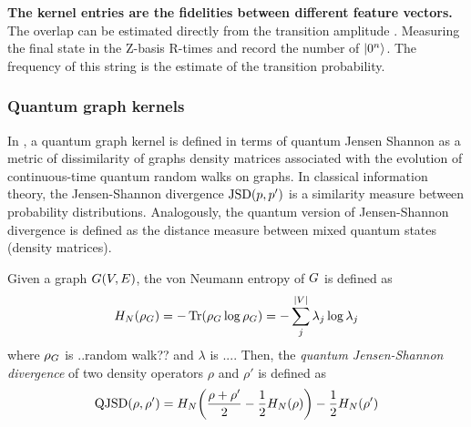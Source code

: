 \textbf{The kernel entries are the fidelities between different feature vectors.}
The overlap can be estimated directly from the transition amplitude 
.
Measuring the final state in the Z-basis R-times and record the number of $\ket{0^n}$.
The frequency of this string is the estimate of the transition probability.


\subsubsection{Quantum graph kernels}
In \cite{baiQuantumJensenShannon2015},
a quantum graph kernel is defined in terms of quantum Jensen Shannon as a metric of dissimilarity of graphs
density matrices associated with the evolution of continuous-time quantum random walks on graphs.
In classical information theory, the Jensen-Shannon divergence $\textup{JSD}(p,p')$ is a similarity measure between probability distributions.
Analogously, the quantum version of Jensen-Shannon divergence is defined as the distance measure between mixed quantum states (density matrices).
\begin{definition}[]
	Given a graph $G(V,E)$, the von Neumann entropy of $G$ is defined as
	\begin{equation}
		H_N (\rho_{G}) = -\Tr(\rho_{G}\log \rho_{G})
		= - \sum_{j}^{\abs{V}} \lambda_j \log \lambda_j
	\end{equation}
	where $\rho_{G}$ is ..random walk?? and $\lambda$ is ....
	Then,
	the \emph{quantum Jensen-Shannon divergence} of two density operators $\rho$ and $\rho'$ is defined as
	\begin{equation}
		\textup{QJSD} (\rho,\rho') = 
		H_N\qty(\frac{\rho+\rho'}{2}- \frac{1}{2}H_N(\rho)) - \frac{1}{2} H_N (\rho')
	\end{equation}
\end{definition}
\begin{remark}
	\psd
\end{remark}

